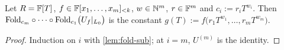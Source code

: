 \begin{corollary}\label{cor:terminal}
Let $R=\mathbb{F}[T]$, $f\in\mathbb{F}[x_1,\dots,x_m]_{<k}$, $w\in\mathbb{N}^m$, $r\in\mathbb{F}^m$ and
$c_i:=r_iT^{w_i}$. Then $\mathrm{Fold}_{c_m}\circ\cdots\circ\mathrm{Fold}_{c_1}\big(U_f|_{L_0}\big)$ is the
constant $g(T):=f\big(r_1T^{w_1},\dots,r_mT^{w_m}\big)$.
\end{corollary}

\begin{proof}
Induction on $i$ with \cref{lem:fold-sub}; at $i=m$, $U^{(m)}$ is the identity.
\end{proof}
